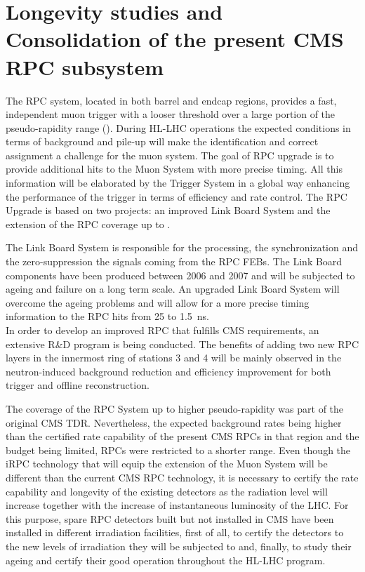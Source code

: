 \renewcommand\evenpagerightmark{{\scshape\small Chapter 5}}
\renewcommand\oddpageleftmark{{\scshape\small Longevity studies and Consolidation of the present CMS RPC subsystem}}

\renewcommand{\bibname}{References}

\hyphenation{}

\chapter[Longevity studies and Consolidation of the present CMS RPC subsystem]{Longevity studies and Consolidation of the present CMS RPC subsystem}
\label{chapt5}
    
	The RPC system, located in both barrel and endcap regions, provides a fast, independent muon trigger with a looser \pT threshold over a large portion of the pseudo-rapidity range (). During HL-LHC operations the expected conditions in terms of background and pile-up will make the identification and correct \pT assignment a challenge for the muon system. The goal of RPC upgrade is to provide additional hits to the Muon System with more precise timing. All this information will be elaborated by the Trigger System in a global way enhancing the performance of the trigger in terms of efficiency and rate control. The RPC Upgrade is based on two projects: an improved Link Board System and the extension of the RPC coverage up to .

	The Link Board System is responsible for the processing, the synchronization and the zero-suppression the signals coming from the RPC FEBs. The Link Board components have been produced between 2006 and 2007 and will be subjected to ageing and failure on a long term scale. An upgraded Link Board System will overcome the ageing problems and will allow for a more precise timing information to the RPC hits from 25 to \SI{1.5}{ns}.\\
	In order to develop an improved RPC that fulfills CMS requirements, an extensive R\&D program is being conducted. The benefits of adding two new RPC layers in the innermost ring of stations 3 and 4 will be mainly observed in the neutron-induced background reduction and efficiency improvement for both trigger and offline reconstruction.

	The coverage of the RPC System up to higher pseudo-rapidity  was part of the original CMS TDR. Nevertheless, the expected background rates being higher than the certified rate capability of the present CMS RPCs in that region and the budget being limited, RPCs were restricted to a shorter range. Even though the iRPC technology that will equip the extension of the Muon System will be different than the current CMS RPC technology, it is necessary to certify the rate capability and longevity of the existing detectors as the radiation level will increase together with the increase of instantaneous luminosity of the LHC. For this purpose, spare RPC detectors built but not installed in CMS have been installed in different irradiation facilities, first of all, to certify the detectors to the new levels of irradiation they will be subjected to and, finally, to study their ageing and certify their good operation throughout the HL-LHC program.

